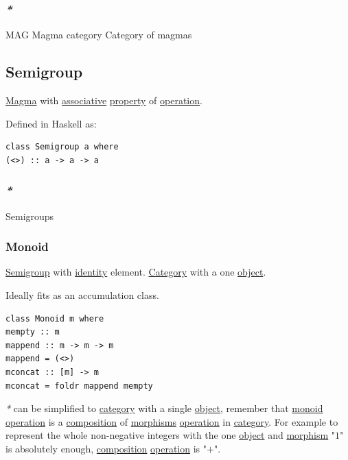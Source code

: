 \documentclass[a4paper,14pt,oneside]{book}
\begin{document}
\subsubsection{\emph{*}}
\label{sec:org4e0b9be}

\label{orgc9f8a1b}MAG
\label{orga444b2d}Magma category
\label{org1a174d8}Category of magmas

\subsection{\label{org19d1b2f}Semigroup}
\label{sec:orgb52b271}
\hyperref[org6f5545b]{Magma} with \hyperref[orga66f8ae]{associative} \hyperref[orgbb6ea59]{property} of \hyperref[orgf147542]{operation}.

Defined in Haskell as:
\begin{verbatim}
class Semigroup a where
(<>) :: a -> a -> a
\end{verbatim}

\subsubsection{\emph{*}}
\label{sec:org9538ae5}

\label{org4a8abc8}Semigroups

\subsubsection{\label{orgb10cc2a}Monoid}
\label{sec:org23e28a4}
\hyperref[org19d1b2f]{Semigroup} with \hyperref[orgc014b57]{identity} element. \hyperref[orge2e250a]{Category} with a one \hyperref[orged022cb]{object}.

Ideally fits as an accumulation class.

\begin{verbatim}
class Monoid m where
mempty :: m
mappend :: m -> m -> m
mappend = (<>)
mconcat :: [m] -> m
mconcat = foldr mappend mempty
\end{verbatim}

\emph{*} can be simplified to \hyperref[orge2e250a]{category} with a single \hyperref[orged022cb]{object}, remember that \hyperref[orgb10cc2a]{monoid} \hyperref[orgf147542]{operation} is a \hyperref[org1b47f42]{composition} of \hyperref[org46b4110]{morphisms} \hyperref[orgf147542]{operation} in \hyperref[orge2e250a]{category}.
For example to represent the whole non-negative integers with the one \hyperref[orged022cb]{object} and \hyperref[org60b7530]{morphism} "\(1\)" is absolutely enough, \hyperref[org1b47f42]{composition} \hyperref[orgf147542]{operation} is "\(+\)".
\end{document}
